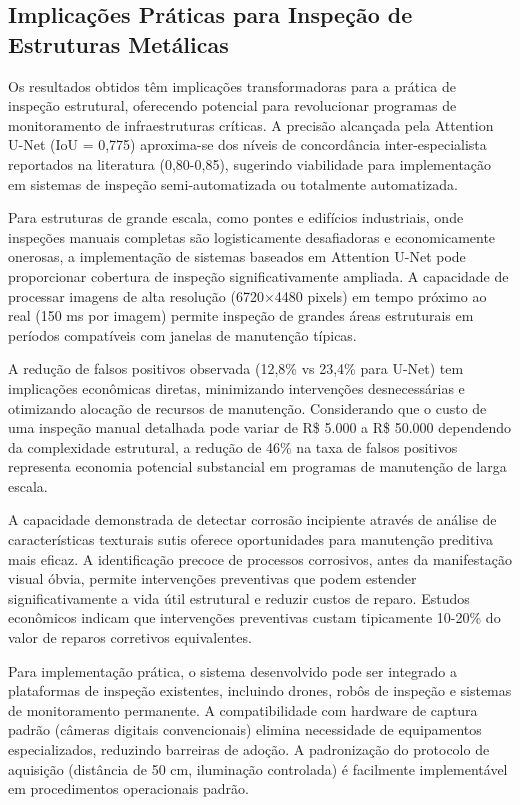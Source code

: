 \documentclass[12pt,a4paper,twoside]{article}
\begin{document}
\subsection{Implicações Práticas para Inspeção de Estruturas Metálicas}
\label{subsec:implicacoes_praticas}

Os resultados obtidos têm implicações transformadoras para a prática de inspeção estrutural, oferecendo potencial para revolucionar programas de monitoramento de infraestruturas críticas. A precisão alcançada pela Attention U-Net (IoU = 0,775) aproxima-se dos níveis de concordância inter-especialista reportados na literatura (0,80-0,85), sugerindo viabilidade para implementação em sistemas de inspeção semi-automatizada ou totalmente automatizada.

Para estruturas de grande escala, como pontes e edifícios industriais, onde inspeções manuais completas são logisticamente desafiadoras e economicamente onerosas, a implementação de sistemas baseados em Attention U-Net pode proporcionar cobertura de inspeção significativamente ampliada. A capacidade de processar imagens de alta resolução (6720×4480 pixels) em tempo próximo ao real (150 ms por imagem) permite inspeção de grandes áreas estruturais em períodos compatíveis com janelas de manutenção típicas.

A redução de falsos positivos observada (12,8\% vs 23,4\% para U-Net) tem implicações econômicas diretas, minimizando intervenções desnecessárias e otimizando alocação de recursos de manutenção. Considerando que o custo de uma inspeção manual detalhada pode variar de R\$ 5.000 a R\$ 50.000 dependendo da complexidade estrutural, a redução de 46\% na taxa de falsos positivos representa economia potencial substancial em programas de manutenção de larga escala.

A capacidade demonstrada de detectar corrosão incipiente através de análise de características texturais sutis oferece oportunidades para manutenção preditiva mais eficaz. A identificação precoce de processos corrosivos, antes da manifestação visual óbvia, permite intervenções preventivas que podem estender significativamente a vida útil estrutural e reduzir custos de reparo. Estudos econômicos indicam que intervenções preventivas custam tipicamente 10-20\% do valor de reparos corretivos equivalentes.

Para implementação prática, o sistema desenvolvido pode ser integrado a plataformas de inspeção existentes, incluindo drones, robôs de inspeção e sistemas de monitoramento permanente. A compatibilidade com hardware de captura padrão (câmeras digitais convencionais) elimina necessidade de equipamentos especializados, reduzindo barreiras de adoção. A padronização do protocolo de aquisição (distância de 50 cm, iluminação controlada) é facilmente implementável em procedimentos operacionais padrão.
\end{document}
